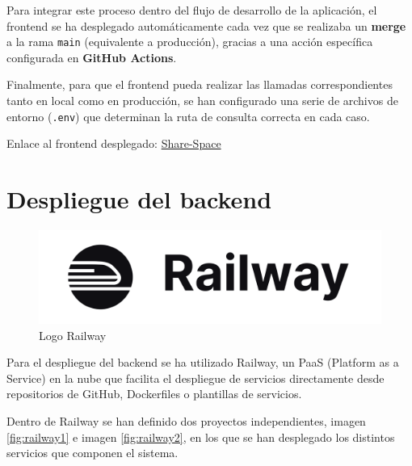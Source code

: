 Para integrar este proceso dentro del flujo de desarrollo de la aplicación, el frontend se ha desplegado automáticamente cada vez que se realizaba un \textbf{merge} a la rama \texttt{main} (equivalente a producción), gracias a una acción específica configurada en \textbf{GitHub Actions}. 

Finalmente, para que el frontend pueda realizar las llamadas correspondientes tanto en local como en producción, se han configurado una serie de archivos de entorno (\texttt{.env}) que determinan la ruta de consulta correcta en cada caso.

\vspace{0.25em}
Enlace al frontend desplegado: \href{https://alonsodm12.github.io/TFG_COHOUSING/}{Share-Space}


\section{Despliegue del backend}

\begin{figure}[H]
  \centering
  \includegraphics[width=1\textwidth]{fotos/railway.png}
  \caption{Logo Railway}
  \label{fig:railway}
\end{figure}
Para el despliegue del backend se ha utilizado Railway, un PaaS (Platform as a Service) en la nube que facilita el despliegue de servicios directamente desde repositorios de GitHub, Dockerfiles o plantillas de servicios.

Dentro de Railway se han definido dos proyectos independientes, imagen \ref{fig:railway1} e imagen \ref{fig:railway2}, en los que se han desplegado los distintos servicios que componen el sistema.

